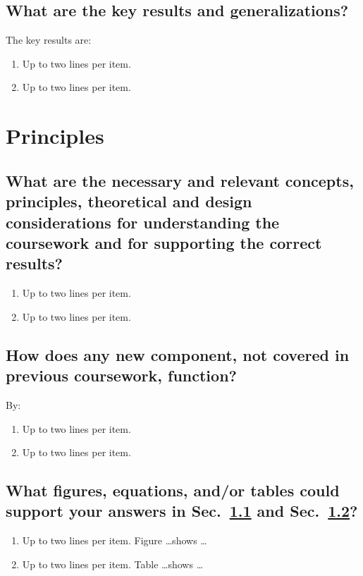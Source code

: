 \subsection{What are the key results and generalizations?}
The key results are:
\begin{enumerate}
\item Up to two lines per item.
\item Up to two lines per item.
\end{enumerate}

 








\section{Principles}
\label{sec:concps}

\subsection{What are the necessary and relevant concepts, principles, theoretical and design considerations for understanding the coursework and for supporting the correct results?}
\label{sec:nrcp}
\begin{enumerate}
\item Up to two lines per item.
\item Up to two lines per item.
\end{enumerate}

\subsection{How does any new component, not covered in previous coursework, function?}
\label{sec:nfxn}
By:
\begin{enumerate}
\item Up to two lines per item.
\item Up to two lines per item.
\end{enumerate}
	
\subsection{What figures, equations, and/or tables could support your answers in Sec.~\ref{sec:nrcp} and Sec.~\ref{sec:nfxn}?}
\begin{enumerate}
\item Up to two lines per item. Figure \ldots shows \ldots
\item Up to two lines per item. Table \ldots shows \ldots
\end{enumerate}
	

